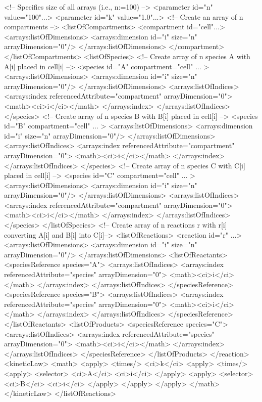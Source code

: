 \begin{example}
<!-- Specifies size of all arrays (i.e., n:=100) -->
<parameter id="n" value="100"...>
<parameter id="k" value="1.0"...>
<!-- Create an array of n compartments -->
<listOfCompartments> 
 <compartment id="cell"...>
  <arrays:listOfDimensions>
   <arrays:dimension id="i" size="n" arrayDimension="0"/>
  </arrays:listOfDimensions>
 </compartment>
</listOfCompartments> 
<listOfSpecies>
 <!-- Create array of n species A with A[i] placed in cell[i] -->
 <species id="A" compartment="cell" ... > 
  <arrays:listOfDimensions>
   <arrays:dimension id="i" size="n" arrayDimension="0"/>
  </arrays:listOfDimensions>
  <arrays:listOfIndices>
   <arrays:index referencedAttribute="compartment" arrayDimension="0">
    <math><ci>i</ci></math>
   </arrays:index>
  </arrays:listOfIndices>
 </species>
 <!-- Create array of n species B with B[i] placed in cell[i] -->
 <species id="B" compartment="cell" ... > 
  <arrays:listOfDimensions>
   <arrays:dimension id="i" size="n" arrayDimension="0"/>
  </arrays:listOfDimensions>
  <arrays:listOfIndices>
   <arrays:index referencedAttribute="compartment" arrayDimension="0">
    <math><ci>i</ci></math>
   </arrays:index>
  </arrays:listOfIndices>
 </species>
 <!-- Create array of n species C with C[i] placed in cell[i] -->
 <species id="C" compartment="cell" ... >
  <arrays:listOfDimensions>
   <arrays:dimension id="i" size="n" arrayDimension="0"/>
  </arrays:listOfDimensions>
  <arrays:listOfIndices>
   <arrays:index referencedAttribute="compartment" arrayDimension="0">
    <math><ci>i</ci></math>
   </arrays:index>
  </arrays:listOfIndices>
 </species>
</listOfSpecies>
<!-- Create array of n reactions r with r[i] converting A[i] and B[i] into C[i]-->
<listOfReactions>
 <reaction id="r" ...> 
  <arrays:listOfDimensions>
   <arrays:dimension id="i" size="n" arrayDimension="0"/>
  </arrays:listOfDimensions>
  <listOfReactants>
   <speciesReference species="A">
    <arrays:listOfIndices>
     <arrays:index referencedAttribute="species" arrayDimension="0">
      <math><ci>i</ci></math>
     </arrays:index>
    </arrays:listOfIndices>
   </speciesReference>
   <speciesReference species="B"> 
    <arrays:listOfIndices>
     <arrays:index referencedAttribute="species" arrayDimension="0">
      <math><ci>i</ci></math>
     </arrays:index>
    </arrays:listOfIndices>
   </speciesReference>
  </listOfReactants> 
  <listOfProducts>
   <speciesReference species="C"> 
    <arrays:listOfIndices>
     <arrays:index referencedAttribute="species" arrayDimension="0">
      <math><ci>i</ci></math>
     </arrays:index>
    </arrays:listOfIndices>
   </speciesReference>
  </listOfProducts>
 </reaction>
 <kineticLaw>
   <math>
     <apply>
       <times/>
       <ci>k</ci>
       <apply>
         <times/>
         <apply>
           <selector>
           <ci>A</ci>
           <ci>i</ci>
         </apply>
         <apply>
           <selector>
           <ci>B</ci>
           <ci>i</ci>
         </apply>
       </apply>
     </apply>
   </math>
 </kineticLaw>
</listOfReactions>
\end{example}

